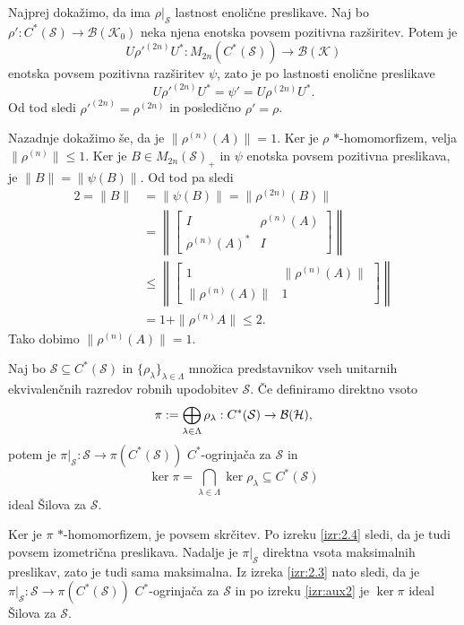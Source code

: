 \begin{dokaz}
    Najprej dokažimo, da ima $\rho \big|_{\mathcal{S}}$ lastnost enolične preslikave.
    Naj bo ${\rho'}: C^*(\mathcal{S}) \to \mathcal{B}(\mathcal{K}_0)$ neka njena enotska povsem pozitivna razširitev.
    Potem je $$U {\rho'} ^{(2n)} U^*: M_{2n} (C^*(\mathcal{S})) \to \mathcal{B}(\mathcal{K})$$ enotska povsem pozitivna razširitev $\psi$, zato je po 
    lastnosti enolične preslikave $$U {\rho'}^{(2n)} U^* = \psi' = U {\rho}^{(2n)} U^*.$$
    Od tod sledi ${\rho'} ^{(2n)} = \rho ^{(2n)}$ in posledično $\rho' = \rho$.
    
    Nazadnje dokažimo še, da je $\| \rho^{(n)} (A) \|= 1$.
    Ker je $\rho$ $*$-homomorfizem, velja $\| \rho^{(n)}\| \leq 1$.
    Ker je $B \in M_{2n} (\mathcal{S})_+$ in $\psi$ enotska povsem pozitivna preslikava,
    je $\| B \| = \| \psi(B) \|$. Od tod pa sledi 
    \begin{align*}
        2 =\| B\| &= \| \psi(B)\| = \| \rho^{(2n)} (B) \|\\
        &= \left\| \begin{bmatrix}
            I & \rho^{(n)} (A)\\
            \rho^{(n)} (A)^* & I
        \end{bmatrix} \right\|\\
        &\leq \left\| \begin{bmatrix}
            1 & \| \rho^{(n)} (A) \|\\
            \| \rho^{(n)} (A) \| & 1
        \end{bmatrix} \right\|\\
        &= 1 + \| \rho^{(n)} A\| \leq 2.
    \end{align*}
    Tako dobimo $\| \rho^{(n)} (A)\| = 1$.
\end{dokaz}

\begin{posledica}
    Naj bo $\mathcal{S} \subseteq C^*(\mathcal{S})$  
    in $\{\rho_\lambda\}_{\lambda \in \Lambda}$ množica predstavnikov vseh unitarnih ekvivalenčnih razredov robnih upodobitev $\mathcal{S}$.
    Če definiramo direktno vsoto $$\pi := \bigoplus_{\lambda \in \Lambda} \rho_\lambda: C^*(\mathcal{S}) \to \operatorname{\mathcal{B} (\mathcal{H})},$$
    potem je $\pi|_{\mathcal{S}}: \mathcal{S} \to \pi(C^*(\mathcal{S}))$
    $C^*$-ogrinjača za $\mathcal{S}$ in 
    $$\ker \pi = \bigcap_{\lambda \in \Lambda} \ker \rho_\lambda \subseteq C^*(\mathcal{S})$$
    ideal Šilova za $\mathcal{S}$.
\end{posledica}

\begin{dokaz}
    Ker je $\pi$ $*$-homomorfizem, je povsem skrčitev. Po izreku \ref{izr:2.4}
    sledi, da je tudi povsem izometrična preslikava. Nadalje je $\pi\big|_{\mathcal{S}}$
    direktna vsota maksimalnih preslikav, zato je tudi sama maksimalna.
    Iz izreka \ref{izr:2.3} nato sledi, da je $\pi\big|_{\mathcal{S}}: \mathcal{S} \to \pi(C^*(\mathcal{S}))$ 
    $C^*$-ogrinjača za $\mathcal{S}$ in po izreku \ref{izr:aux2} je $\ker \pi$ ideal Šilova za $\mathcal{S}$.
\end{dokaz}

